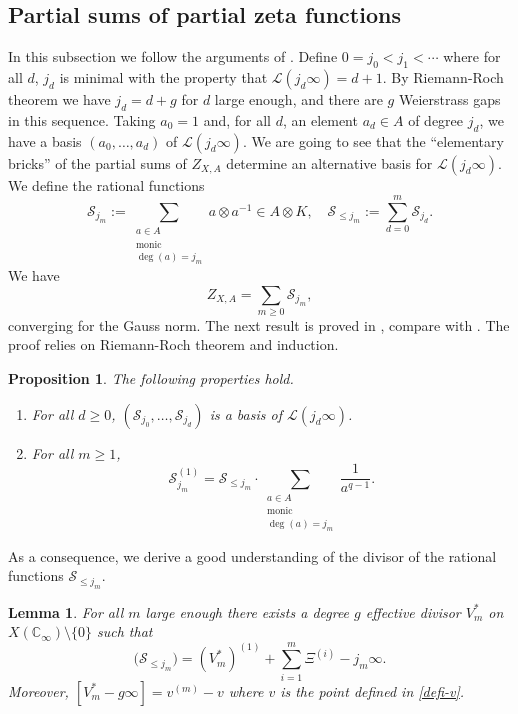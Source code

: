 \documentclass[11pt]{amsart}
\numberwithin{equation}{section}
\newcommand{\CC}{\mathbb{C}}
\newtheorem{Lemma}[Theorem]{Lemma}
\newtheorem{Proposition}[Theorem]{Proposition}
\begin{document}
\subsection{Partial sums of partial zeta functions}
In this subsection we follow the arguments of \cite{CHU&NGO&PEL}. 
Define $0=j_0<j_1<\cdots$ where for all $d$, $j_d$ is minimal with the property that $\mathcal{L}(j_d\infty)=d+1$. By Riemann-Roch theorem
we have $j_d=d+g$ for $d$ large enough, and there are $g$ Weierstrass gaps in this sequence. Taking $a_0=1$ and, for all $d$, an element $a_{d}\in A$ of degree $j_d$, we have a basis $(a_0,\ldots,a_d)$ of $\mathcal{L}(j_d\infty)$. We are going to see that 
the ``elementary bricks'' of the partial sums of $Z_{X,A}$ determine an alternative basis for $\mathcal{L}(j_d\infty)$.
We define the rational functions
\begin{equation*}
\mathcal{S}_{j_m}:=\sum_{\begin{smallmatrix}a\in A\\ \text{monic}\\ \deg(a)=j_m\end{smallmatrix}}a\otimes a^{-1}\in A\otimes K,
\quad\mathcal{S}_{\leq j_m}:=\sum_{d=0}^m\mathcal{S}_{j_d}.
\end{equation*}
We have
$$Z_{X,A}=\sum_{m\geq0}\mathcal{S}_{j_m},$$ converging for the Gauss norm.
The next result is proved in \cite[\S 2.2]{CHU&NGO&PEL}, compare with \cite[Propositions 6.3, 6.4]{GRE&PAP}. The proof relies on Riemann-Roch theorem and induction.

\begin{Proposition}\label{proposition-new-bases}
The following properties hold.
\begin{enumerate}
\item For all $d\geq 0$, $(\mathcal{S}_{j_0},\ldots,\mathcal{S}_{j_d})$ is a basis of $\mathcal{L}(j_d\infty)$.
\item For all $m\geq 1$, $$\mathcal{S}_{j_m}^{(1)}=\mathcal{S}_{\leq j_m}\cdot\sum_{\begin{smallmatrix}
a\in A \\ \text{monic} \\ \deg(a)=j_m
\end{smallmatrix}}\frac{1}{a^{q-1}}.$$
\end{enumerate}
\end{Proposition}
As a consequence, we derive a good understanding of the divisor of the rational functions $\mathcal{S}_{\leq j_m}$.
\begin{Lemma}\label{divisor-partial-sums}
For all $m$ large enough there exists a degree $g$ effective divisor $V^*_m$ on $X(\CC_\infty)\setminus\{0\}$ such that 
\begin{equation}\label{divisor-of-Sj}
\Big(\mathcal{S}_{\leq j_m}\Big)=(V^*_m)^{(1)}+\sum_{i=1}^m\Xi^{(i)}-j_m\infty.
\end{equation}
Moreover, $[V^*_m-g\infty]=v^{(m)}-v$ where $v$ is the point defined in \eqref{defi-v}. 
\end{Lemma}
\end{document}
